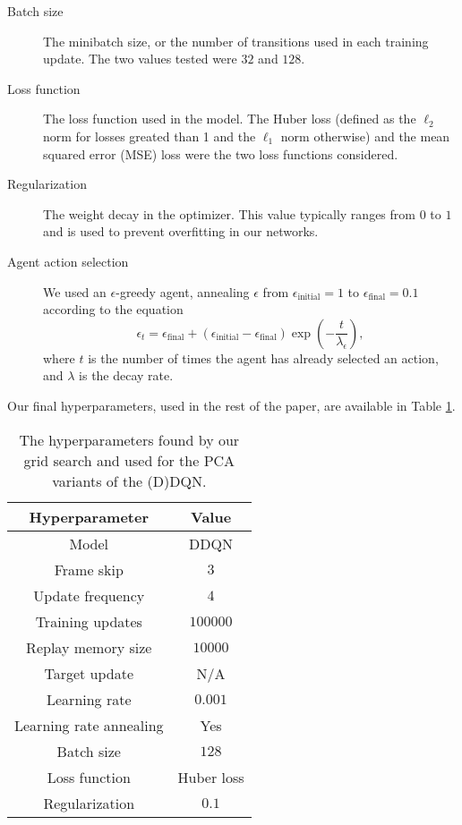 \documentclass[11pt]{article}
\begin{document}
\begin{description}
    \item[Batch size] The minibatch size, or the number of transitions used in each training update. The two values tested were $32$ and $128$.
    
    \item[Loss function] The loss function used in the model. The Huber loss (defined as the $\ell_2$ norm for losses greated than 1 and the $\ell_1$ norm otherwise) and the mean squared error (MSE) loss were the two loss functions considered.
    
    \item[Regularization] The weight decay in the optimizer. This value typically ranges from $0$ to $1$ and is used to prevent overfitting in our networks.
    
    \item[Agent action selection] We used an $\epsilon$-greedy agent, annealing $\epsilon$ from $\epsilon_\text{initial} = 1$ to $\epsilon_\text{final} = 0.1$ according to the equation $$\epsilon_t = \epsilon_\text{final} + (\epsilon_\text{initial} - \epsilon_\text{final}) \exp\left(-\frac{t}{\lambda_\epsilon}\right),$$ where $t$ is the number of times the agent has already selected an action, and $\lambda$ is the decay rate. 
\end{description}

Our final hyperparameters, used in the rest of the paper, are available in Table \ref{tab:grid_search_hyperparameters}.

\begin{table}[!htbp]
    \centering
    \begin{tabular}{c|c}
        \toprule
        Hyperparameter & Value \\ \midrule
        Model & DDQN \\
        Frame skip & $3$ \\
        Update frequency & $4$ \\
        Training updates & $100000$ \\
        Replay memory size & $10000$ \\
        Target update & N/A \\
        Learning rate & $0.001$ \\
        Learning rate annealing & Yes \\
        Batch size & $128$ \\
        Loss function & Huber loss \\
        Regularization & $0.1$ \\
        \bottomrule
    \end{tabular}
    \caption{The hyperparameters found by our grid search and used for the PCA variants of the (D)DQN.}
    \label{tab:grid_search_hyperparameters}
\end{table}
\end{document}

